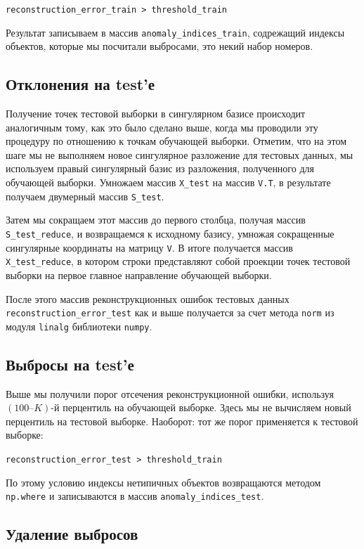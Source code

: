 \documentclass[a4paper,12pt]{article}
\begin{document}
\medskip\noindent
\texttt{reconstruction\_error\_train > threshold\_train}

\medskip\noindent
Результат записываем в массив \texttt{anomaly\_indices\_train}, содрежащий индексы объектов, которые мы посчитали выбросами, это некий набор номеров.

\subsection{Отклонения на test'е}


Получение точек тестовой выборки в сингулярном базисе происходит аналогичным тому, как это было сделано выше, когда мы проводили эту процедуру по отношению к точкам обучающей выборки. Отметим, что на этом шаге мы не выполняем новое сингулярное разложение для тестовых данных, мы используем правый сингулярный базис из разложения, полученного для обучающей выборки. Умножаем массив \texttt{X\_test} на массив \texttt{V.T}, в результате получаем двумерный массив \texttt{S\_test}.

Затем  мы сокращаем этот массив до первого столбца, получая массив \texttt{S\_test\_reduce}, и возвращаемся к исходному базису, умножая сокращенные сингулярные координаты на матрицу \texttt{V}. В итоге получается массив \texttt{X\_test\_reduce}, в котором строки представляют собой проекции точек тестовой выборки на первое главное направление обучающей выборки.

После этого массив реконструкционных ошибок тестовых данных \texttt{reconstruction\_error\_test} как и выше получается за счет метода \texttt{norm} из модуля \texttt{linalg} библиотеки \texttt{numpy}.


\subsection{Выбросы на test'е}


Выше мы получили порог отсечения реконструкционной ошибки, используя $(100 – K)$-й перцентиль на обучающей выборке. Здесь мы не вычисляем новый перцентиль на тестовой выборке. Наоборот: тот же порог применяется к тестовой выборке:

\medskip\noindent
\texttt{reconstruction\_error\_test > threshold\_train}

\medskip\noindent
По этому условию индексы нетипичных объектов возвращаются методом \texttt{np.where} и записываются в массив \texttt{anomaly\_indices\_test}.

\subsection{Удаление выбросов}
\end{document}
